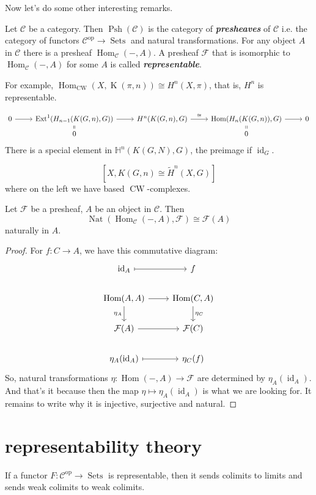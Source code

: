 \documentclass{article}
\renewcommand{\H}{\mathbb{H}}
\newcommand{\Cc}{\mathcal{C}}
\newcommand{\Fc}{\mathcal{F}}
\DeclareMathOperator{\id}{id}
\DeclareMathOperator{\Ext}{Ext}
\DeclareMathOperator{\Hom}{Hom}
\DeclareMathOperator{\K}{K}
\DeclareMathOperator{\CW}{CW}
\DeclareMathOperator{\op}{op}
\DeclareMathOperator{\Psh}{Psh}
\DeclareMathOperator{\Sets}{Sets}
\DeclareMathOperator{\Nat}{Nat}
\begin{document}
Now let's do some other interesting remarks.
\begin{defn}
	Let $\Cc$ be a category. Then $\Psh(\Cc)$ is the category of \textbf{\textit{presheaves}} of $\Cc$ i.e. the category of functors $\Cc^{\op}\to\Sets$ and natural transformations. For any object $A$ in $\Cc$ there is a presheaf $\Hom_{\Cc}(-,A)$. A presheaf $\Fc$ that is isomorphic to $\Hom_\Cc(-,A)$ for some $A$ is called \textbf{\textit{representable}}.
\end{defn}

For example, $\Hom_{\CW}(X,\K(\pi,n))\cong H^n(X,\pi)$, that is, $H^n$ is representable.

\[\begin{tikzcd}[row sep=tiny]
	0\arrow[r]&\Ext^1(H_{n-1}(K(G,n),G))\arrow[r]&H^n(K(G,n),G)\arrow[r,"\cong"]&\Hom(H_n(K(G,n)),G)\arrow[r]&0\\
	&0\arrow[u,equal]&&0\arrow[u,equal]
\end{tikzcd}\]
There is a special element in $\H^n(K(G,N),G)$, the preimage if $\id_G$.
\begin{claim}
	\[[X,K(G,n)\cong\tilde{H}^n(X,G)]\]
	where on the left we have based $\CW$-complexes. 
\end{claim}

\begin{lemma}[Yoneda]
	Let $\Fc$ be a presheaf, $A$ be an object in $\Cc$. Then
	\[\Nat(\Hom_{\Cc}(-,A),\Fc)\cong \Fc(A)\]
	naturally in $A$.
\end{lemma}
\begin{proof} For $f:C\to A$, we have this commutative diagram:
	\[\begin{tikzcd}
		\id_A\arrow[r,maps to]&f\\
		\Hom(A,A)\arrow[r]\arrow[d,swap,"\eta_A"]&\Hom(C,A)\arrow[d,"\eta_C"]\\
		\Fc(A)\arrow[r]&\Fc(C)\\
		\eta_A(\id_A)\arrow[r,maps to]&\eta_C(f)
	\end{tikzcd}\]
	So, natural transformations $\eta:\Hom(-,A)\to \Fc$ are determined by $\eta_A(\id_A)$. And that's it because then the map $\eta\mapsto\eta_A(\id_A)$ is what we are looking for. It remains to write why it is injective, surjective and natural.
\end{proof}

\section{representability theory}
If a functor $F:\Cc^{\op}\to\Sets$ is representable, then it sends colimits to limits and sends weak colimits to weak colimits.
\end{document}
